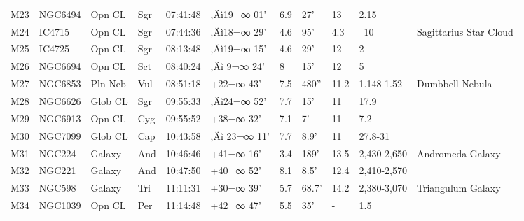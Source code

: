 \documentclass[10pt,twoside,a4paper,english]{report}
\begin{document}
\begin{longtable}{@{}lllllllllll@{}}
M23        & NGC6494     & Opn CL     & Sgr       & 07:41:48 & ‚Äì19¬∞ 01'  & 6.9       & 27'                  & 13       & 2.15                &                                           \\ 
M24        & IC4715      & Opn CL     & Sgr       & 07:44:36 & ‚Äì18¬∞ 29'  & 4.6       & 95'                  & 4.3      & ~10                 & Sagittarius Star Cloud                    \\ 
M25        & IC4725      & Opn CL     & Sgr       & 08:13:48 & ‚Äì19¬∞ 15'  & 4.6       & 29'                  & 12       & 2                   &                                           \\ 
M26        & NGC6694     & Opn CL     & Sct       & 08:40:24 & ‚Äì 9¬∞ 24'  & 8         & 15'                  & 12       & 5                   &                                           \\ 
M27        & NGC6853     & Pln Neb    & Vul       & 08:51:18 & +22¬∞ 43'  & 7.5       & 480''                & 11.2     & 1.148-1.52          & Dumbbell Nebula                           \\ 
M28        & NGC6626     & Glob CL    & Sgr       & 09:55:33 & ‚Äì24¬∞ 52'  & 7.7       & 15'                  & 11       & 17.9                &                                           \\ 
M29        & NGC6913     & Opn CL     & Cyg       & 09:55:52 & +38¬∞ 32'  & 7.1       & 7'                   & 11       & 7.2                 &                                           \\ 
M30        & NGC7099     & Glob CL    & Cap       & 10:43:58 & ‚Äì 23¬∞ 11' & 7.7       & 8.9'                 & 11       & 27.8-31             &                                           \\ 
M31        & NGC224      & Galaxy     & And       & 10:46:46 & +41¬∞ 16'  & 3.4       & 189'                 & 13.5     & 2,430-2,650         & Andromeda Galaxy                          \\ 
M32        & NGC221      & Galaxy     & And       & 10:47:50 & +40¬∞ 52'  & 8.1       & 8.5'                 & 12.4     & 2,410-2,570         &                                           \\ 
M33        & NGC598      & Galaxy     & Tri       & 11:11:31 & +30¬∞ 39'  & 5.7       & 68.7'                & 14.2     & 2,380-3,070         & Triangulum Galaxy                         \\ 
M34        & NGC1039     & Opn CL     & Per       & 11:14:48 & +42¬∞ 47'  & 5.5       & 35'                  & -        & 1.5                 &                                           \\ 

\end{longtable}
\end{document}
